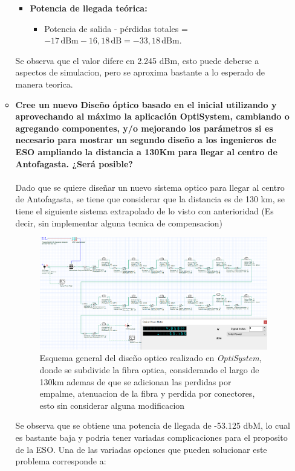 \begin{enumerate}
\begin{itemize}
\begin{itemize}
			\item \textbf{Potencia de llegada teórica:} 
			\begin{itemize}
				\item Potencia de salida - pérdidas totales = \( -17 \, \text{dBm} - 16,18 \, \text{dB} = -33,18 \, \text{dBm} \).
			\end{itemize}
		\end{itemize}
		Se observa que el valor difere en 2.245 dBm, esto puede deberse a aspectos de simulacion, pero se aproxima bastante a lo esperado de manera teorica.
	\item \textbf{Cree un nuevo Diseño óptico basado en el inicial utilizando y aprovechando al máximo la aplicación OptiSystem, cambiando o agregando componentes, y/o mejorando los parámetros si es necesario para mostrar un segundo diseño a los ingenieros de ESO
	ampliando la distancia a 130Km para llegar al centro de Antofagasta. ¿Será posible?}\\\\
	Dado que se quiere diseñar un nuevo sistema optico para llegar al centro de Antofagasta, se tiene que considerar que la distancia es de 130 km, se tiene el siguiente sistema extrapolado de lo visto con anterioridad (Es decir, sin implementar alguna tecnica de compensacion)
	\begin{figure}
		\centering
		\includegraphics[width=0.9\linewidth]{img/P7_4.png}
		\caption{Esquema general del diseño optico realizado en \textit{OptiSystem}, donde se subdivide la fibra optica, considerando el largo de 130km ademas de que se adicionan las perdidas por empalme, atenuacion de la fibra y perdida por conectores, esto sin considerar alguna modificacion}
		\label{fig:imagen1}
	\end{figure}
	Se observa que se obtiene una potencia de llegada de -53.125 dbM, lo cual es bastante baja y podria tener variadas complicaciones para el proposito de la ESO. Una de las variadas opciones que pueden solucionar este problema corresponde a:

\end{itemize}
\end{enumerate}
